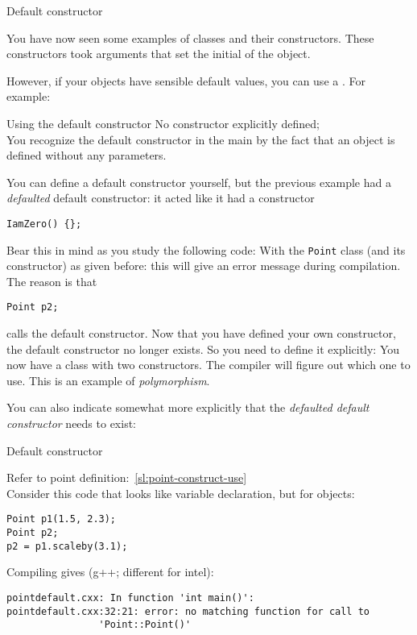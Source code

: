  {Default constructor}
\label{sec:default-constructor}

You have now seen some examples of classes and their constructors.
These constructors took arguments that set the initial  of the object.

However, if your objects have sensible default values, you can use a
.
For example:

\begin{block}{Using the default constructor}
  \label{sl:no-construct-default}
  No constructor explicitly defined;\\
  You recognize the default constructor in the main by the fact that an object
  is defined without any parameters.

\end{block}

You can define a default constructor yourself,
but the previous example had a
\emph{defaulted} default constructor:
it acted like it had a constructor
\begin{lstlisting}
IamZero() {};
\end{lstlisting}

Bear this in mind as you study the following code:
%
%
With the \lstinline{Point} class (and its constructor) as given before:
this will give an error message during compilation. The reason is
that 
\begin{lstlisting}
Point p2;
\end{lstlisting}
calls the default constructor. Now that you have defined your own
constructor, the default constructor no longer exists. So you need to
define it explicitly:
%
%
You now have a class with two constructors.
The compiler will figure out which one to use.
This is an example of \emph{polymorphism}.

You can also indicate somewhat more explicitly that the
\emph{defaulted default constructor} 
needs to exist:

\begin{slide}{Default constructor}
  \label{sl:obj-def-construct1}

  Refer to point definition:~\ref{sl:point-construct-use}\\
  Consider this code that looks like variable declaration,
  but for objects:
\begin{lstlisting}
Point p1(1.5, 2.3);
Point p2;
p2 = p1.scaleby(3.1);
\end{lstlisting}

  Compiling gives (g++; different for intel):
\begin{lstlisting}
pointdefault.cxx: In function 'int main()':
pointdefault.cxx:32:21: error: no matching function for call to
                'Point::Point()'
\end{lstlisting}
\end{slide}

